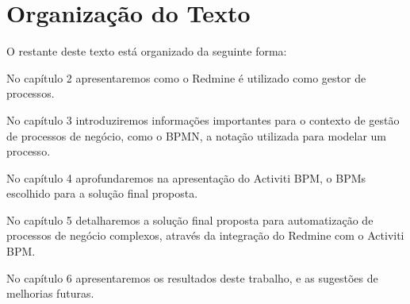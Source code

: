 \section{Organização do Texto}\label{sec:introducao-organizacao_texto}

O restante deste texto está organizado da seguinte forma: 

No capítulo 2 apresentaremos como o Redmine é utilizado como gestor de processos.

No capítulo 3 introduziremos informações importantes para o contexto de gestão de processos de negócio, como o BPMN, a notação utilizada para modelar um processo.

No capítulo 4 aprofundaremos na apresentação do Activiti BPM, o BPMs escolhido para a solução final proposta.

No capítulo 5 detalharemos a solução final proposta para automatização de processos de negócio complexos, através da integração do Redmine com o Activiti BPM.

No capítulo 6 apresentaremos os resultados deste trabalho, e as sugestões de melhorias futuras.